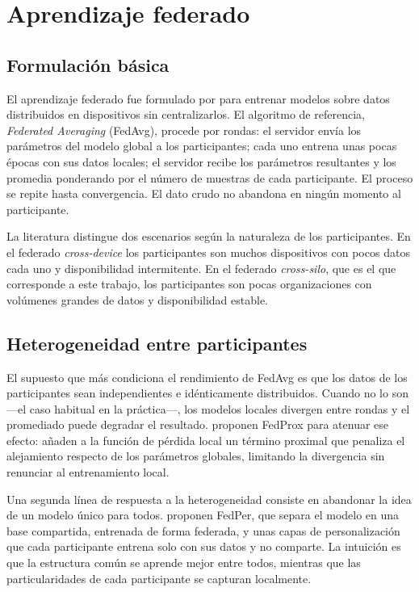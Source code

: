\section{Aprendizaje federado}

\subsection{Formulación básica}

El aprendizaje federado fue formulado por \textcite{mcmahan2017} para entrenar modelos sobre datos
distribuidos en dispositivos sin centralizarlos. El algoritmo de referencia, \emph{Federated
Averaging} (FedAvg), procede por rondas: el servidor envía los parámetros del modelo global a los
participantes; cada uno entrena unas pocas épocas con sus datos locales; el servidor recibe los
parámetros resultantes y los promedia ponderando por el número de muestras de cada participante. El
proceso se repite hasta convergencia. El dato crudo no abandona en ningún momento al participante.

La literatura distingue dos escenarios según la naturaleza de los participantes. En el federado
\emph{cross-device} los participantes son muchos dispositivos con pocos datos cada uno y
disponibilidad intermitente. En el federado \emph{cross-silo}, que es el que corresponde a este
trabajo, los participantes son pocas organizaciones con volúmenes grandes de datos y disponibilidad
estable.

\subsection{Heterogeneidad entre participantes}

El supuesto que más condiciona el rendimiento de FedAvg es que los datos de los participantes sean
independientes e idénticamente distribuidos. Cuando no lo son —el caso habitual en la práctica—, los
modelos locales divergen entre rondas y el promediado puede degradar el resultado.
\textcite{li2020fedprox} proponen FedProx para atenuar ese efecto: añaden a la función de pérdida
local un término proximal que penaliza el alejamiento respecto de los parámetros globales, limitando
la divergencia sin renunciar al entrenamiento local.

Una segunda línea de respuesta a la heterogeneidad consiste en abandonar la idea de un modelo único
para todos. \textcite{arivazhagan2019} proponen FedPer, que separa el modelo en una base compartida,
entrenada de forma federada, y unas capas de personalización que cada participante entrena solo con
sus datos y no comparte. La intuición es que la estructura común se aprende mejor entre todos,
mientras que las particularidades de cada participante se capturan localmente.

